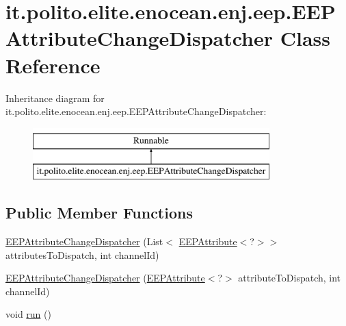 \hypertarget{classit_1_1polito_1_1elite_1_1enocean_1_1enj_1_1eep_1_1_e_e_p_attribute_change_dispatcher}{}\section{it.\+polito.\+elite.\+enocean.\+enj.\+eep.\+E\+E\+P\+Attribute\+Change\+Dispatcher Class Reference}
\label{classit_1_1polito_1_1elite_1_1enocean_1_1enj_1_1eep_1_1_e_e_p_attribute_change_dispatcher}
Inheritance diagram for it.\+polito.\+elite.\+enocean.\+enj.\+eep.\+E\+E\+P\+Attribute\+Change\+Dispatcher\+:\begin{figure}[H]
\begin{center}
\leavevmode
\includegraphics[height=2.000000cm]{classit_1_1polito_1_1elite_1_1enocean_1_1enj_1_1eep_1_1_e_e_p_attribute_change_dispatcher}
\end{center}
\end{figure}
\subsection*{Public Member Functions}
\begin{DoxyCompactItemize}
\item 
\hyperlink{classit_1_1polito_1_1elite_1_1enocean_1_1enj_1_1eep_1_1_e_e_p_attribute_change_dispatcher_aeaebbb308bbaa023caa6aa222a23f176}{E\+E\+P\+Attribute\+Change\+Dispatcher} (List$<$ \hyperlink{classit_1_1polito_1_1elite_1_1enocean_1_1enj_1_1eep_1_1_e_e_p_attribute}{E\+E\+P\+Attribute}$<$?$>$$>$ attributes\+To\+Dispatch, int channel\+Id)
\item 
\hyperlink{classit_1_1polito_1_1elite_1_1enocean_1_1enj_1_1eep_1_1_e_e_p_attribute_change_dispatcher_a8345b9e5d9927422f12439d000db7062}{E\+E\+P\+Attribute\+Change\+Dispatcher} (\hyperlink{classit_1_1polito_1_1elite_1_1enocean_1_1enj_1_1eep_1_1_e_e_p_attribute}{E\+E\+P\+Attribute}$<$?$>$ attribute\+To\+Dispatch, int channel\+Id)
\item 
void \hyperlink{classit_1_1polito_1_1elite_1_1enocean_1_1enj_1_1eep_1_1_e_e_p_attribute_change_dispatcher_a43e5a4a2041335a3c0f32ca987bc0fb5}{run} ()
\end{DoxyCompactItemize}


